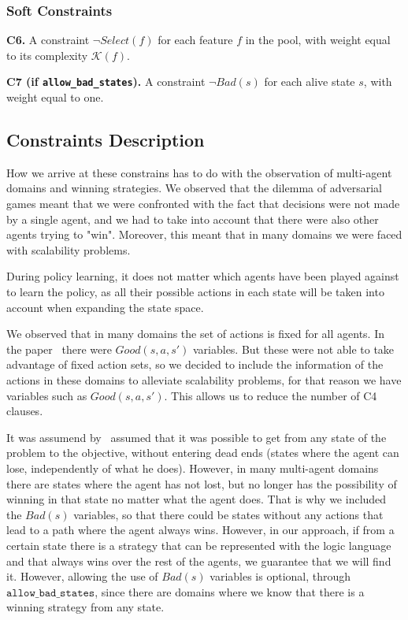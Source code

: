 \documentclass[a4paper]{article}
\newcommand{\smallpar}[1]{{\vspace{10pt}\noindent \bf #1.}}
\begin{document}
\subsubsection{Soft Constraints}

\smallpar{C6}
A constraint $\neg Select(f)$ for each feature $f$ in the pool, with weight equal to its complexity $\mathcal{K}(f)$.

\smallpar{C7 (if \texttt{allow\_bad\_states})}
A constraint $\neg Bad(s)$ for each alive state $s$, with weight equal to one.


\subsection{Constraints Description}

How we arrive at these constrains has to do with the observation of multi-agent domains and winning strategies. We observed that the dilemma of adversarial games meant that we were confronted with the fact that decisions were not made by a single agent, and we had to take into account that there were also other agents trying to "win". Moreover, this meant that in many domains we were faced with scalability problems.

During policy learning, it does not matter which agents have been played against to learn the policy, as all their possible actions in each state will be taken into account when expanding the state space.

We observed that in many domains the set of actions is fixed for all agents. In the paper~\cite{frances2021learning} there were $Good(s, a, s')$ variables. But these were not able to take advantage of fixed action sets, so we decided to include the information of the actions in these domains to alleviate scalability problems, for that reason we have variables such as $Good(s, a, s')$.
 This allows us to reduce the number of C4 clauses.

It was assumend by~\cite{frances2021learning} assumed that it was possible to get from any state of the problem to the objective, without entering dead ends (states where the agent can lose, independently of what he does). However, in many multi-agent domains there are states where the agent has not lost, but no longer has the possibility of winning in that state no matter what the agent does. That is why we included the $Bad(s)$ variables, so that there could be states without any actions that lead to a path where the agent always wins. However, in our approach, if from a certain state there is a strategy that can be represented with the logic language and that always wins over the rest of the agents, we guarantee that we will find it. However, allowing the use of $Bad(s)$ variables is optional, through~$\texttt{allow\_bad\_states}$, since there are domains where we know that there is a winning strategy from any state.
\end{document}
